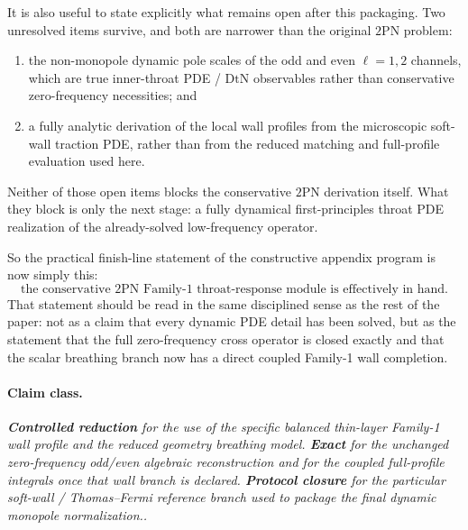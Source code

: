 \documentclass[11pt]{article}
\newcommand{\TwoPN}{\mathrm{2PN}}
\newcommand{\DtN}{\mathrm{DtN}}
\newcommand{\Exact}{\textbf{Exact}}
\newcommand{\Controlled}{\textbf{Controlled reduction}}
\newcommand{\Protocol}{\textbf{Protocol closure}}
\newcommand{\claimclass}[1]{\paragraph{Claim class.}\emph{#1.}}
\begin{document}
It is also useful to state explicitly what remains open after this packaging.
Two unresolved items survive, and both are narrower than the original \(\TwoPN\) problem:
\begin{enumerate}[leftmargin=1.5em]
  \item the non-monopole dynamic pole scales of the odd and even
  \(\ell=1,2\) channels, which are true inner-throat PDE / \(\DtN\) observables rather
  than conservative zero-frequency necessities; and
  \item a fully analytic derivation of the local wall profiles from the microscopic
  soft-wall traction PDE, rather than from the reduced matching and full-profile
  evaluation used here.
\end{enumerate}
Neither of those open items blocks the conservative \(\TwoPN\) derivation itself.
What they block is only the next stage: a fully dynamical first-principles throat PDE
realization of the already-solved low-frequency operator.

So the practical finish-line statement of the constructive appendix program is now simply
this:
\begin{equation}
\boxed{
\text{the conservative }\TwoPN\text{ Family-1 throat-response module is effectively in hand.}
}
\label{eq:family1-final-practical-finish-line}
\end{equation}
That statement should be read in the same disciplined sense as the rest of the paper: not
as a claim that every dynamic PDE detail has been solved, but as the statement that the
full zero-frequency cross operator is closed exactly and that the scalar breathing branch
now has a direct coupled Family-1 wall completion.

\claimclass{\Controlled{} for the use of the specific balanced thin-layer Family-1 wall
profile and the reduced geometry breathing model.
\Exact{} for the unchanged zero-frequency odd/even algebraic reconstruction and for the
coupled full-profile integrals once that wall branch is declared.
\Protocol{} for the particular soft-wall / Thomas--Fermi reference branch used to package
the final dynamic monopole normalization.}
\end{document}
